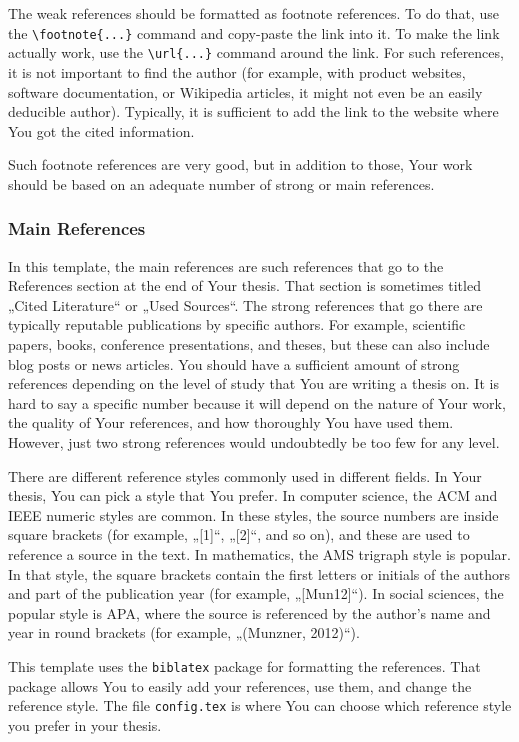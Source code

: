 The weak references should be formatted as footnote references. To do that, use the \verb|\footnote{...}| command and copy-paste the link into it. To make the link actually work, use the \verb|\url{...}| command around the link. For such references, it is not important to find the author (for example, with product websites, software documentation, or Wikipedia articles, it might not even be an easily deducible author). Typically, it is sufficient to add the link to the website where You got the cited information.

Such footnote references are very good, but in addition to those, Your work should be based on an adequate number of strong or main references.

\subsubsection{Main References}
In this template, the main references are such references that go to the References section at the end of Your thesis. That section is sometimes titled „Cited Literature“ or „Used Sources“. The strong references that go there are typically reputable publications by specific authors. For example, scientific papers, books, conference presentations, and theses, but these can also include blog posts or news articles. You should have a sufficient amount of strong references depending on the level of study that You are writing a thesis on. It is hard to say a specific number because it will depend on the nature of Your work, the quality of Your references, and how thoroughly You have used them. However, just two strong references would undoubtedly be too few for any level.

There are different reference styles commonly used in different fields. In Your thesis, You can pick a style that You prefer. In computer science, the ACM and IEEE numeric styles are common. In these styles, the source numbers are inside square brackets (for example, „[1]“, „[2]“, and so on), and these are used to reference a source in the text. In mathematics, the AMS trigraph style is popular. In that style, the square brackets contain the first letters or initials of the authors and part of the publication year (for example, „[Mun12]“). In social sciences, the popular style is APA, where the source is referenced by the author’s name and year in round brackets (for example, „(Munzner, 2012)“).

This template uses the \verb|biblatex| package for formatting the references. That package allows You to easily add your references, use them, and change the reference style. The file \verb|config.tex| is where You can choose which reference style you prefer in your thesis.

